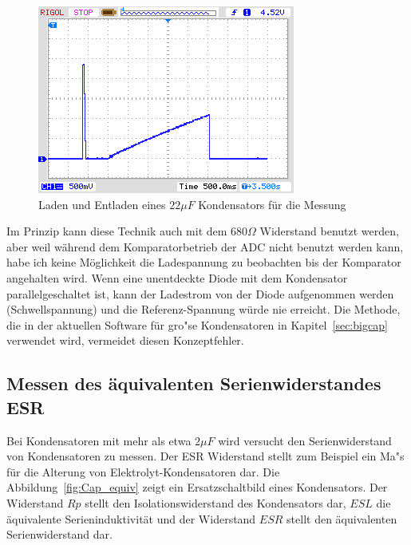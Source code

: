 \begin{figure}[H]
  \centering
    \includegraphics[]{../PNG/charge_22uF.png}
  \caption{Laden und Entladen eines \(22\mu F\) Kondensators f\"ur die Messung}
  \label{pic:c22uF}
\end{figure}


Im Prinzip kann diese Technik auch mit dem \(680\Omega\) Widerstand benutzt werden,
aber weil w\"ahrend dem Komparatorbetrieb der ADC nicht benutzt werden kann, habe ich keine
M\"oglichkeit die Ladespannung zu beobachten bis der Komparator angehalten wird.
Wenn eine unentdeckte Diode mit dem Kondensator parallelgeschaltet ist, kann der Ladestrom
von der Diode aufgenommen werden (Schwellspannung) und die Referenz-Spannung w\"urde nie erreicht.
Die Methode, die in der aktuellen Software f\"ur gro"se Kondensatoren in Kapitel~\ref{sec:bigcap}
verwendet wird, vermeidet diesen Konzeptfehler.

\subsection{Messen des \"aquivalenten Serienwiderstandes ESR}
Bei Kondensatoren mit mehr als etwa \(2 \mu F\) wird versucht den Serienwiderstand von Kondensatoren zu messen.
Der ESR Widerstand stellt zum Beispiel ein Ma"s f\"ur die Alterung von Elektrolyt-Kondensatoren dar.
Die Abbildung~\ref{fig:Cap_equiv} zeigt ein Ersatzschaltbild eines Kondensators.
Der Widerstand \(Rp\) stellt den Isolationswiderstand des Kondensators dar, \(ESL\) die \"aquivalente
Serieninduktivit\"at und der Widerstand \(ESR\) stellt den \"aquivalenten Serienwiderstand dar.

